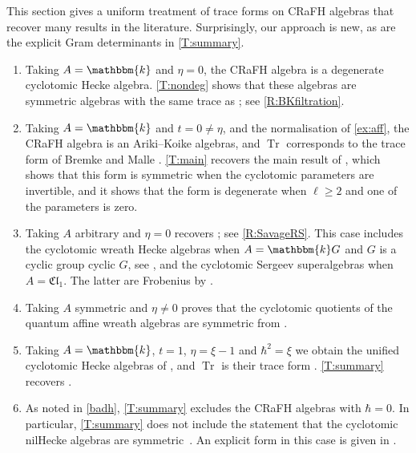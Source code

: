 \documentclass[a4paper,11pt]{amsart}
\newcommand{\Tr}{\op{Tr}}
\numberwithin{equation}{subsection}
\theoremstyle{definition}
\theoremstyle{theorem}
\theoremstyle{remark}
\newcommand\op{\operatorname}
\newcommand\kk{\mathbbm{k}}
\begin{document}
\begin{Remark}\label{R:recover}
  This section gives a uniform treatment of trace
  forms on CRaFH algebras that recover many results in the literature.
  Surprisingly, our approach is new, as are the explicit Gram determinants in \autoref{T:summary}.
\begin{enumerate}
\item Taking $A=\kk$ and $\eta=0$, the CRaFH algebra is a degenerate cyclotomic Hecke algebra. \autoref{T:nondeg} shows that these algebras are symmetric algebras with the same trace as \cite[Theorem~A.2]{BK:HigherSchurWeyl}; see \autoref{R:BKfiltration}.
\item Taking $A=\kk$ and $t=0\neq\eta$, and the normalisation of \autoref{ex:aff}, the CRaFH algebra is an  Ariki--Koike algebras, and $\Tr$ corresponds to the trace form of Bremke and Malle \cite{BM:redwds}. \autoref{T:main} recovers the main result of \cite{MalleMathas}, which shows that this form is symmetric when the cyclotomic parameters are invertible, and it shows that the form is degenerate when $\ell\geq2$ and one of the parameters is zero.
\item Taking $A$ arbitrary and $\eta=0$ recovers \cite[Theorem~6.15]{Savage:AffineWreath}; see \autoref{R:SavageRS}. This case includes the cyclotomic wreath Hecke algebras when $A=\kk G$ and $G$ is a cyclic group cyclic $G$, see \cite[Theorem~2.4]{Cui:degYokonuma}, and the cyclotomic Sergeev superalgebras when $A=\mathfrak{Cl}_1$. The latter are Frobenius by \cite[Corollary~15.6.4]{Kleshchevbook}.
\item Taking $A$ symmetric and $\eta\neq0$ proves that the cyclotomic
quotients of the quantum affine wreath algebras  are symmetric from \cite{RossoSavage:QuantumAffineWreath}.
\item  Taking $A=\kk$, $t=1$, $\eta=\xi-1$ and $\hbar^2=\xi$ we obtain the unified cyclotomic Hecke algebras of \cite[Definition~2.1]{HeHuLin:traceForm}, and $\Tr$ is their trace form \cite[Definition~3.5]{HeHuLin:traceForm}. \autoref{T:summary} recovers \cite[Theorem~3.16]{HeHuLin:traceForm}.
\item As noted in \autoref{badh},
\autoref{T:summary} excludes the CRaFH algebras with $\hbar=0$. In
particular, \autoref{T:summary} does not include the statement that the
cyclotomic nilHecke algebras are symmetric~\cite{SVV:center}. An
explicit form in this case is given in
\cite[Definition~4.11, Theorem~5.11]{HuLiang:nilHecke}.
\end{enumerate}
\end{Remark}
\end{document}
